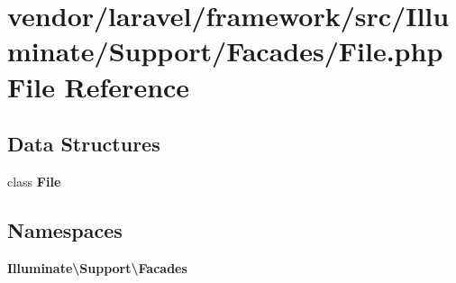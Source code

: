 \section{vendor/laravel/framework/src/\+Illuminate/\+Support/\+Facades/\+File.php File Reference}
\label{laravel_2framework_2src_2_illuminate_2_support_2_facades_2_file_8php}
\subsection*{Data Structures}
\begin{DoxyCompactItemize}
\item 
class {\bf File}
\end{DoxyCompactItemize}
\subsection*{Namespaces}
\begin{DoxyCompactItemize}
\item 
 {\bf Illuminate\textbackslash{}\+Support\textbackslash{}\+Facades}
\end{DoxyCompactItemize}
